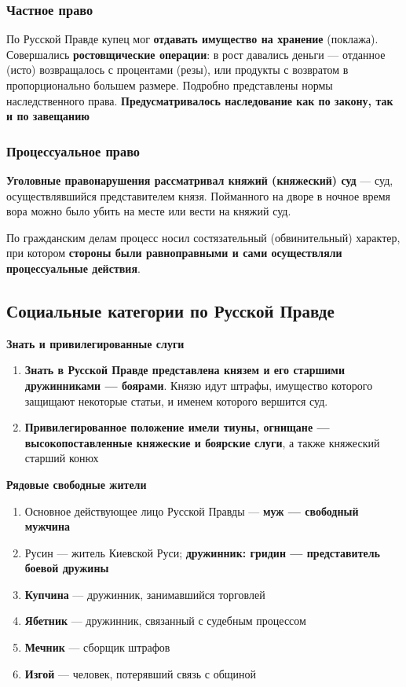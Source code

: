 \documentclass{article}
\begin{document}
\subsubsection{Частное право}

По Русской Правде купец мог \textbf{отдавать имущество на хранение} (поклажа). Совершались \textbf{ростовщические операции}: в рост давались деньги — отданное (исто) возвращалось с процентами (резы), или продукты с возвратом в пропорционально большем размере. Подробно представлены нормы наследственного права. \textbf{Предусматривалось наследование как по закону, так и по завещанию}

\subsubsection{Процессуальное право}

\textbf{Уголовные правонарушения рассматривал княжий (княжеский) суд} — суд, осуществлявшийся представителем князя. Пойманного на дворе в ночное время вора можно было убить на месте или вести на княжий суд.

По гражданским делам процесс носил состязательный (обвинительный) характер, при котором \textbf{стороны были равноправными и сами осуществляли процессуальные действия}.

\subsection{Социальные категории по Русской Правде}

\textbf{Знать и привилегированные слуги}

\begin{enumerate}
    \item \textbf{Знать в Русской Правде представлена князем и его старшими дружинниками — боярами}. Князю идут штрафы, имущество которого защищают некоторые статьи, и именем которого вершится суд.
    \item \textbf{Привилегированное положение имели тиуны, огнищане — высокопоставленные княжеские и боярские слуги}, а также княжеский старший конюх
\end{enumerate}

\hfill

\textbf{Рядовые свободные жители}

\begin{enumerate}
    \item Основное действующее лицо Русской Правды — \textbf{муж — свободный мужчина}
    \item Русин — житель Киевской Руси; \textbf{дружинник: гридин — представитель боевой дружины}
    \item \textbf{Купчина} — дружинник, занимавшийся торговлей
    \item \textbf{Ябетник} — дружинник, связанный с судебным процессом
    \item \textbf{Мечник} — сборщик штрафов
    \item \textbf{Изгой} — человек, потерявший связь с общиной
\end{enumerate}
\end{document}
